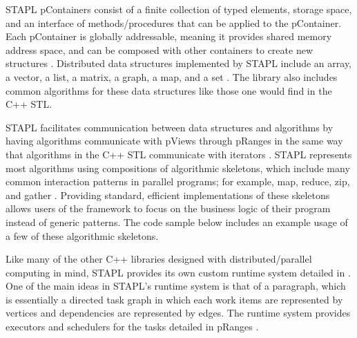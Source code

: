 STAPL pContainers consist of a finite collection of typed elements, storage space, and an interface of methods/procedures that can be applied to the pContainer. \cite{stapl_parallel_container} Each pContainer is globally addressable, meaning it provides shared memory address space, and can be composed with other containers to create new structures \cite{stapl_parallel_container}. Distributed data structures implemented by STAPL include an array, a vector, a list, a matrix, a graph, a map, and a set \cite{stapl_parray} \cite{stapl_graph}. The library also includes common algorithms for these data structures like those one would find in the C++ STL. 

STAPL facilitates communication between data structures and algorithms by having algorithms communicate with pViews through pRanges in the same way that algorithms in the C++ STL communicate with iterators \cite{stapl_parallel_container}. STAPL represents most algorithms using compositions of algorithmic skeletons, which include many common interaction patterns in parallel programs; for example, map, reduce, zip, and gather \cite{stapl_skeleton_framework}. Providing standard, efficient implementations of these skeletons allows users of the framework to focus on the business logic of their program instead of generic patterns. The code sample below includes an example usage of a few of these algorithmic skeletons. 

Like many of the other C++ libraries designed with distributed/parallel computing in mind, STAPL provides its own custom runtime system detailed in \cite{stapl_rts}. One of the main ideas in STAPL's runtime system is that of a paragraph, which is essentially a directed task graph in which each work items are represented by vertices and dependencies are represented by edges. The runtime system provides executors and schedulers for the tasks detailed in pRanges \cite{STAPL_2010}.
